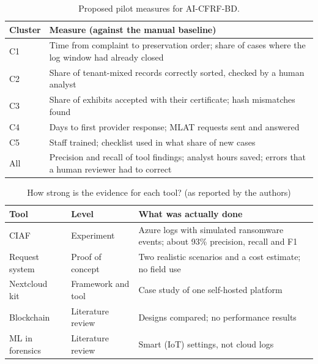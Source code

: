 \documentclass[conference]{IEEEtran}
\begin{document}
\begin{table}[t]
\centering
\caption{Proposed pilot measures for AI-CFRF-BD.}
\label{tab:eval}
\small
\renewcommand{\arraystretch}{1.05}
\begin{tabularx}{\columnwidth}{@{}l X@{}}
\toprule
Cluster & Measure (against the manual baseline) \\
\midrule
C1 & Time from complaint to preservation order; share of cases where the log window had already closed \\
C2 & Share of tenant-mixed records correctly sorted, checked by a human analyst \\
C3 & Share of exhibits accepted with their certificate; hash mismatches found \\
C4 & Days to first provider response; MLAT requests sent and answered \\
C5 & Staff trained; checklist used in what share of new cases \\
All & Precision and recall of tool findings; analyst hours saved; errors that a human reviewer had to correct \\
\bottomrule
\end{tabularx}
\end{table}

\begin{table}[t]
\centering
\caption{How strong is the evidence for each tool? (as reported by the authors)}
\label{tab:maturity}
\small
\renewcommand{\arraystretch}{1.05}
\begin{tabularx}{\columnwidth}{@{}l l X@{}}
\toprule
Tool & Level & What was actually done \\
\midrule
CIAF~\cite{ciaf} & Experiment & Azure logs with simulated ransomware events; about 93\% precision, recall and F1 \\
Request system~\cite{akilal} & Proof of concept & Two realistic scenarios and a cost estimate; no field use \\
Nextcloud kit~\cite{kulper} & Framework and tool & Case study of one self-hosted platform \\
Blockchain~\cite{igonor} & Literature review & Designs compared; no performance results \\
ML in forensics~\cite{tageldin} & Literature review & Smart (IoT) settings, not cloud logs \\
\bottomrule
\end{tabularx}
\end{table}
\end{document}

